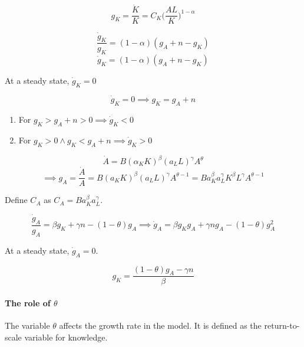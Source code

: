 \begin{equation*}
    g_{K}=\frac{\Dot{K}}{K}=C_{K}\bigg(\frac{AL}{K}\bigg)^{1-\alpha}
\end{equation*}

\begin{equation*}
    \frac{\Dot{g}_{K}}{g_{K}}=(1-\alpha)(g_{A}+n-g_{K})
\end{equation*}
\begin{equation*}
    \Dot{g}_{K}=(1-\alpha)(g_{A}+n-g_{K})
\end{equation*}


At a steady state, $\Dot{g}_{K}=0$

\begin{equation*}
    \Dot{g}_{K}=0 \implies g_{K}=g_{A}+n
\end{equation*}

\begin{enumerate}
    \item For $g_{K}>g_{A}+n>0 \implies \Dot{g}_{K}<0$
    \item For $g_{K}>0 \wedge g_{K}<g_{A}+n \implies \Dot{g}_{K}>0$
\end{enumerate}

\begin{equation*}
    \Dot{A}=B(\alpha_{K}K)^\beta(a_{L}L)^\gamma A^\theta
\end{equation*}
\begin{equation*}
    \implies g_{A}=\frac{\Dot{A}}{A}=B(a_{K}K)^\beta(a_{L}L)^\gamma A^{\theta-1}=B a_{K}^\beta a_{L}^\gamma K^\beta L^\gamma A^{\theta-1}
\end{equation*}

Define $C_{A}$ as $C_{A}=B a_{K}^\beta a_{L}^\gamma$. 

\begin{equation*}
    \frac{\Dot{g}_{A}}{g_{A}}=\beta g_{K}+\gamma n -(1-\theta)g_{A} \implies \Dot{g}_{A}=\beta g_{K}g_{A}+\gamma n g_{A}-(1-\theta)g_{A}^2
\end{equation*}

At a steady state, $\Dot{g}_{A}=0$. 

\begin{equation}\label{GrowthA}
    g_{K}=\frac{(1-\theta)g_{A}-\gamma n}{\beta}
\end{equation}


\paragraph{The role of $\theta$}
The variable $\theta$ affects the growth rate in the model. It is defined as the return-to-scale variable for knowledge. 


